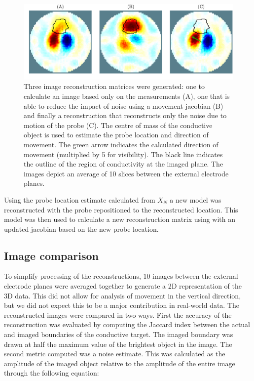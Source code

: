 \begin{figure}
    \centering
   \includegraphics[width=\textwidth]{chapter7-internal_elec_motion/imgs/recon_methods.pdf} 
   \caption[Motion correction methods]{\label{fig:motion_correction_methods} 
	Three image reconstruction matrices were generated: one to calculate an image based 
	only on the measurements (A), one that is able to reduce the impact of noise using a 
	movement jacobian (B) and finally a reconstruction that reconstructs only the noise 
	due to motion of the probe (C). The centre of mass of the conductive object is used to
	estimate the probe location and direction of movement. The green arrow indicates the 
	calculated direction of movement (multiplied by 5 for visibility).
	The black line indicates the outline of the region of conductivity at the imaged plane.
	The images depict an average of 10 slices between the external electrode planes.}
\end{figure}

Using the probe location estimate calculated from $X_N$
a new model was reconstructed with the probe repositioned 
to the reconstructed location. 
This model was then used to calculate a new reconstruction matrix 
using 
with an updated jacobian based on the new probe location. 


\subsection{Image comparison}
To simplify processing of the reconstructions, 10 images between the 
external electrode planes were averaged together to generate a 2D 
representation of the 3D data. This did not allow for analysis of movement in the vertical 
direction, but we did not expect this to be a major contribution in real-world data.
The reconstructed images were compared in two ways. First the accuracy of the reconstruction
was evaluated by computing the Jaccard index between the actual and imaged boundaries of the 
conductive target. The imaged boundary was drawn at half the maximum value of the brightest 
object in the image. The second metric computed was a noise estimate. This was calculated as
the amplitude of the imaged object relative to the amplitude of the entire image through the
following equation:

